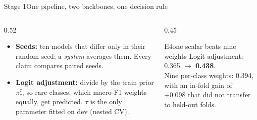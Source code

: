 \documentclass[aspectratio=169,10pt]{beamer}
\newcommand{\hl}[1]{\textcolor{accent}{\textbf{#1}}}
\newcommand{\stagelabel}{Final evaluation}
\newcommand{\setstage}[1]{\renewcommand{\stagelabel}{#1}}
\begin{document}
\setstage{Stage 1: what limits a classifier?}
\begin{frame}{Stage 1\quad One pipeline, two backbones, one decision rule}
  \centering
  \resizebox{0.97\textwidth}{!}{}
  \vspace{4pt}
  \begin{columns}[T]
    \begin{column}{0.52\textwidth}
      \small
      \begin{itemize}\setlength{\itemsep}{2pt}
        \item \textbf{Seeds:} ten models that differ only in their random seed; a \emph{system} averages them. Every
              claim compares paired seeds.
        \item \textbf{Logit adjustment:} divide by the train prior $\pi_c^{\tau}$, so rare classes, which macro-F1 weights
              equally, get predicted. $\tau$ is the only parameter fitted on dev (nested CV).
      \end{itemize}
    \end{column}
    \begin{column}{0.45\textwidth}
      \begin{block}{E4\quad one scalar beats nine weights}
        \small
        Logit adjustment: 0.365 $\rightarrow$ \hl{0.438}.\\
        Nine per-class weights: 0.394, with an in-fold gain of +0.098 that did not transfer to held-out folds.
      \end{block}
    \end{column}
  \end{columns}
\end{frame}
\end{document}
